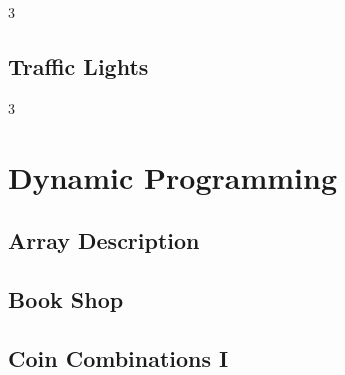 \documentclass[8pt]{extarticle}
\begin{document}
\begin{multicols*}{3}
\subsection{Traffic Lights}
\begin{caixaenunciado}

\end{caixaenunciado}
\vspace{0.3cm}

\end{multicols*}
\pagebreak
\begin{multicols*}{3}

\section{Dynamic Programming}

\subsection{Array Description}
\begin{caixaenunciado}

\end{caixaenunciado}
\vspace{0.3cm}


\subsection{Book Shop}
\begin{caixaenunciado}

\end{caixaenunciado}
\vspace{0.3cm}


\subsection{Coin Combinations I}
\begin{caixaenunciado}

\end{caixaenunciado}
\vspace{0.3cm}



\end{multicols*}
\end{document}
